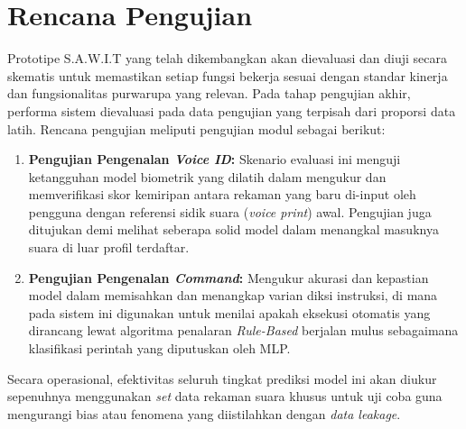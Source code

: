 \section{Rencana Pengujian}
Prototipe S.A.W.I.T yang telah dikembangkan akan dievaluasi dan diuji secara skematis untuk memastikan setiap fungsi bekerja sesuai dengan standar kinerja dan fungsionalitas purwarupa yang relevan. Pada tahap pengujian akhir, performa sistem dievaluasi pada data pengujian yang terpisah dari proporsi data latih. Rencana pengujian meliputi pengujian modul sebagai berikut:
\begin{enumerate}
    \item \textbf{Pengujian Pengenalan \textit{Voice ID}:} Skenario evaluasi ini menguji ketangguhan model biometrik yang dilatih dalam mengukur dan memverifikasi skor kemiripan antara rekaman yang baru di-input oleh pengguna dengan referensi sidik suara (\textit{voice print}) awal. Pengujian juga ditujukan demi melihat seberapa solid model dalam menangkal masuknya suara di luar profil terdaftar.
    \item \textbf{Pengujian Pengenalan \textit{Command}:} Mengukur akurasi dan kepastian model dalam memisahkan dan menangkap varian diksi instruksi, di mana pada sistem ini digunakan untuk menilai apakah eksekusi otomatis yang dirancang lewat algoritma penalaran \textit{Rule-Based} berjalan mulus sebagaimana klasifikasi perintah yang diputuskan oleh MLP.
\end{enumerate}
Secara operasional, efektivitas seluruh tingkat prediksi model ini akan diukur sepenuhnya menggunakan \textit{set} data rekaman suara khusus untuk uji coba guna mengurangi bias atau fenomena yang diistilahkan dengan \textit{data leakage}.
